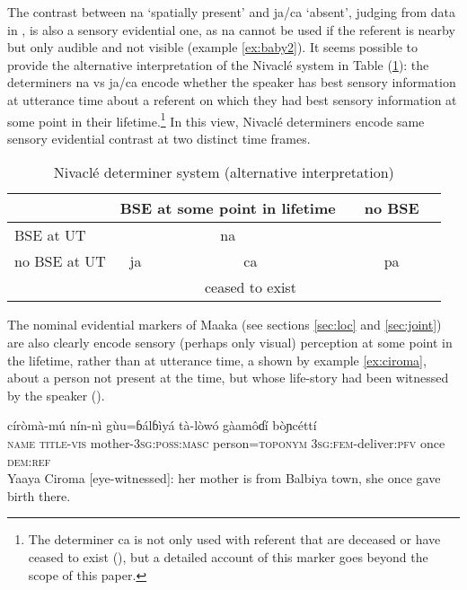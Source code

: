 \documentclass[oneside,a4paper,11pt]{article}
\newcommand{\ipa}[1]{{\phon \mbox{#1}}} %
\begin{document}
The contrast between \ipa{na} `spatially present' and \ipa{ja/ca} `absent', judging from data in \citet{gutierrez14determiners}, is also a sensory evidential one, as \ipa{na} cannot be used if the referent is nearby but only audible and not visible (example \ref{ex:baby2}). It seems possible to provide the alternative interpretation of the Nivaclé system in Table (\ref{tab:nivakle2}): the determiners \ipa{na} vs \ipa{ja/ca} encode whether the speaker has best sensory information at utterance time about a referent on which they had best sensory information at some point in their lifetime.\footnote{The determiner \ipa{ca} is not only used with referent that are deceased or have ceased to exist (\citealt[63-4]{fabre14nivacle}), but a detailed account of this marker goes beyond the scope of this paper. } In this view, Nivaclé determiners encode same sensory evidential contrast at two distinct time frames.
  
 
\begin{table}[H]
\caption{Nivaclé determiner system (alternative interpretation) } \centering \label{tab:nivakle2}
\begin{tabular}{l|c|cc|cc}
\toprule
&\multicolumn{2}{c}{BSE at some point in lifetime} && no BSE \\
\hline
BSE at UT& \multicolumn{2}{c}{\ipa{na}}&& \\
\cline{1-4}
no BSE at UT&\ipa{ja} & \ipa{ca}&&\ipa{pa}& \\
&&ceased to exist&\\
\bottomrule
\end{tabular}
\end{table}

The nominal evidential markers of Maaka (see sections \ref{sec:loc} and \ref{sec:joint}) are also clearly encode sensory (perhaps only visual) perception at some point in the lifetime, rather than at utterance time, a shown by example \ref{ex:ciroma}, about a person not present at the time, but whose life-story had been witnessed by the speaker (\citealt[196]{storch14maaka}).

\begin{exe}
\ex \label{ex:ciroma}
\gll \ipa{yáayà} \ipa{círòmà-mú} \ipa{nín-nì} \ipa{gùu=ɓálɓìyá} \ipa{tà-lòwó} \ipa{gàamôɗí} \ipa{bòɲcéttí} \\
\textsc{name} \textsc{title-vis} mother-\textsc{3sg:poss:masc} person=\textsc{toponym} \textsc{3sg:fem}-deliver:\textsc{pfv} once \textsc{dem:ref} \\
\glt Yaaya Ciroma [eye-witnessed]: her mother is from Balbiya town, she once gave birth there.
\end{exe}
\end{document}
